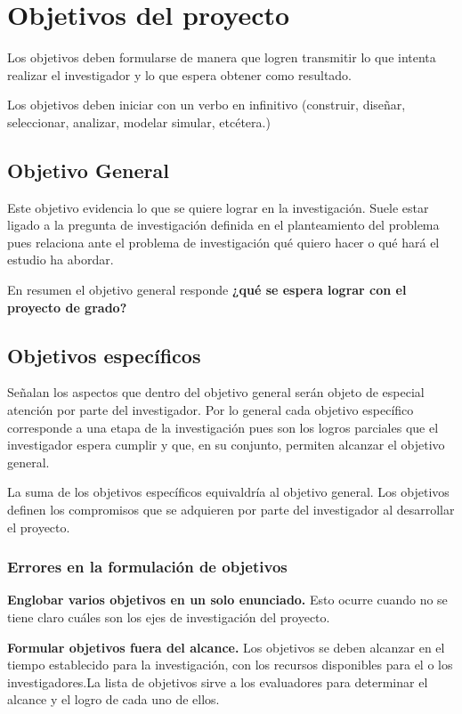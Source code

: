 \section{Objetivos del proyecto}
Los objetivos deben formularse de manera que logren transmitir lo que intenta realizar el investigador y lo que espera obtener como resultado. 

Los objetivos deben iniciar con un verbo en infinitivo (construir, diseñar, seleccionar, analizar, modelar simular, etcétera.) 




\subsection{Objetivo General}
Este objetivo evidencia lo que se quiere lograr en la investigación. Suele estar ligado a la pregunta de investigación definida en el planteamiento del problema pues relaciona ante el problema de investigación qué quiero hacer o qué hará el estudio ha abordar.

En resumen el objetivo general responde \textbf{¿qué se espera lograr con el proyecto de grado?}


\subsection{Objetivos específicos}
Señalan los aspectos que dentro del objetivo general serán objeto de especial atención por parte del investigador. Por lo general cada objetivo específico corresponde a una etapa de la investigación pues son los logros parciales que el investigador espera cumplir y que, en su conjunto, permiten alcanzar el objetivo general.

La suma de los objetivos específicos equivaldría al objetivo general. Los objetivos definen los compromisos que se adquieren por parte del investigador al desarrollar el proyecto.  


\subsubsection*{Errores en la formulación de objetivos}

\textbf{Englobar varios objetivos en un solo enunciado.} Esto ocurre cuando no se tiene claro cuáles son los ejes de investigación del proyecto.



\textbf{Formular objetivos fuera del alcance.} Los objetivos se deben alcanzar en el tiempo establecido para la investigación, con los recursos disponibles para el o los investigadores.La lista de objetivos sirve a los evaluadores para determinar el alcance y el logro de cada uno de ellos. 

